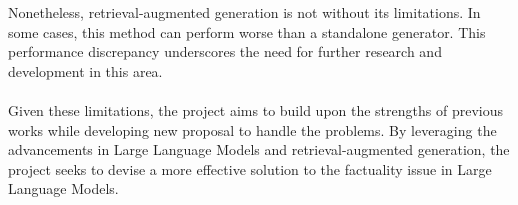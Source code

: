 Nonetheless, retrieval-augmented generation is not without its limitations. In some cases, this method can perform worse than a standalone generator. This performance discrepancy underscores the need for further research and development in this area.\\\\
Given these limitations, the project aims to build upon the strengths of previous works while developing new proposal to handle the problems. By leveraging the advancements in Large Language Models and retrieval-augmented generation, the project seeks to devise a more effective solution to the factuality issue in Large Language Models.
